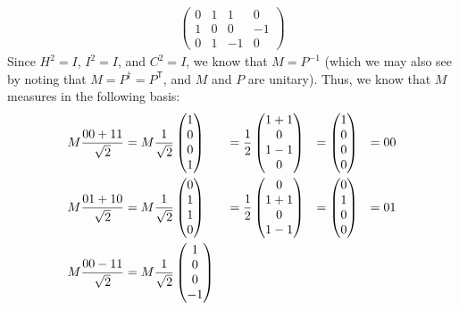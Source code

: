 \documentclass[12pt]{amsart}
\let\ket\relax
\begin{document}
\begin{enumerate}
\begin{align*}
\begin{pmatrix}
           0 & 1 &  1 &  0 \\
           1 & 0 &  0 & -1 \\
           0 & 1 & -1 &  0
         \end{pmatrix}
    \end{align*}
    Since $H^2 = I$, $I^2 = I$, and $C^2 = I$, we know that $M = P^{-1}$ (which
    we may also see by noting that $M = P^\dag = P^{\mathsf{T}}$, and $M$ and
    $P$ are unitary).  Thus, we know that $M$ measures in the following basis:
    \begin{alignat*}{4}
      M\frac{\ket{00} + \ket{11}}{\sqrt{2}}
        &= M\frac{1}{\sqrt{2}}\begin{pmatrix} 1 \\ 0 \\ 0 \\ 1 \end{pmatrix}
       &&= \frac{1}{2}\begin{pmatrix} 1+1 \\ 0 \\ 1-1 \\ 0 \end{pmatrix}
        &= \begin{pmatrix} 1 \\ 0 \\ 0 \\ 0 \end{pmatrix}
       &&= \ket{00} \\
      M\frac{\ket{01} + \ket{10}}{\sqrt{2}}
        &= M\frac{1}{\sqrt{2}}\begin{pmatrix} 0 \\ 1 \\ 1 \\ 0 \end{pmatrix}
       &&= \frac{1}{2}\begin{pmatrix} 0 \\ 1+1 \\ 0 \\ 1-1 \end{pmatrix}
        &= \begin{pmatrix} 0 \\ 1 \\ 0 \\ 0 \end{pmatrix}
       &&= \ket{01} \\
      M\frac{\ket{00} - \ket{11}}{\sqrt{2}}
        &= M\frac{1}{\sqrt{2}}\begin{pmatrix} 1 \\ 0 \\ 0 \\ -1 \end{pmatrix}

\end{alignat*}
\end{enumerate}
\end{document}
